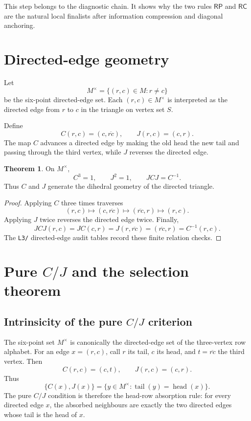 \documentclass[11pt]{article}
\theoremstyle{definition}
\newtheorem{theorem}{Theorem}[section]
\newcommand{\RP}{\mathsf{RP}}
\newcommand{\RC}{\mathsf{RC}}
\begin{document}
This step belongs to the diagnostic chain.  It shows why the two
rules \(\RP\) and \(\RC\) are the natural local finalists after information
compression and diagonal anchoring.

\section{Directed-edge geometry}\label{directed-edge-geometry}

Let \[
M^\times=\{(r,c)\in M:r\ne c\}
\] be the six-point directed-edge set. Each \((r,c)\in M^\times\) is
interpreted as the directed edge from \(r\) to \(c\) in the triangle on
vertex set \(S\).

Define \[
C(r,c)=(c,\overline{rc}),
\qquad
J(r,c)=(c,r).
\] The map \(C\) advances a directed edge by making the old head the new tail and passing through the third vertex, while
\(J\) reverses the directed edge.

\begin{theorem}
\label{thm:11.1}
On \(M^\times\), \[
C^3=1,
\qquad
J^2=1,
\qquad
JCJ=C^{-1}.
\] Thus \(C\) and \(J\) generate the dihedral geometry of the directed
triangle.
\end{theorem}

\begin{proof}
Applying \(C\) three times traverses \[
(r,c)\mapsto(c,\overline{rc})\mapsto(\overline{rc},r)\mapsto(r,c).
\] Applying \(J\) twice reverses the directed edge twice. Finally, \[
JCJ(r,c)=JC(c,r)=J(r,\overline{rc})=(\overline{rc},r)=C^{-1}(r,c).
\] The \texttt{L3/} directed-edge audit tables record these finite relation
checks.
\end{proof}

\section{\texorpdfstring{Pure \(C/J\) and the selection
theorem}{Pure C/J and the selection theorem}}\label{pure-cj-and-the-selection-theorem}

\subsection{Intrinsicity of the pure \texorpdfstring{\(C/J\)}{C/J} criterion}\label{intrinsicity-of-the-pure-cj-criterion}

The six-point set \(M^\times\) is canonically the directed-edge set of the
three-vertex row alphabet.  For an edge \(x=(r,c)\), call \(r\) its tail,
\(c\) its head, and \(t=\overline{rc}\) the third vertex.  Then
\[
C(r,c)=(c,t),
\qquad
J(r,c)=(c,r).
\]
Thus
\[
\{C(x),J(x)\}
=
\{y\in M^\times:\operatorname{tail}(y)=\operatorname{head}(x)\}.
\]
The pure \(C/J\) condition is therefore the head-row absorption rule:
for every directed edge \(x\), the absorbed neighbours are exactly the two
directed edges whose tail is the head of \(x\).
\end{document}
